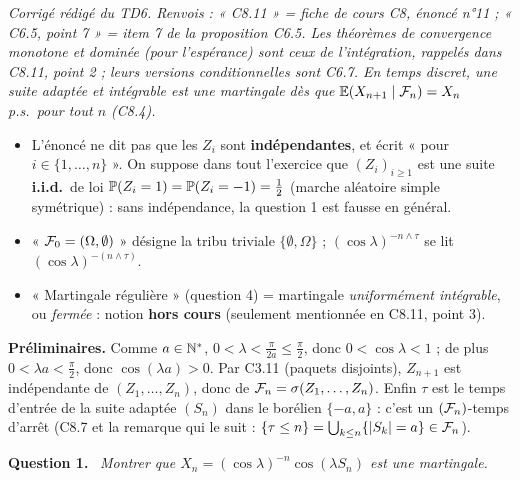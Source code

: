 \documentclass[11pt,a4paper]{article}
\newcommand{\question}[1]{\par\medskip\noindent\textbf{Question #1.}~}
\begin{document}

\textit{Corrigé rédigé du TD6. Renvois : « C8.11 » = fiche de cours C8, énoncé n°11 ; « C6.5, point 7 » = item 7 de la
proposition C6.5. Les théorèmes de convergence monotone et dominée (pour l'espérance) sont ceux de l'intégration, rappelés
dans C8.11, point 2 ; leurs versions conditionnelles sont C6.7. En temps discret, une suite adaptée et intégrable est une
martingale dès que $\mathbb{E}(X_{n+1}\mid\mathcal{F}_n)=X_n$ p.s.\ pour tout $n$ (C8.4).}

\begin{exo}

\begin{alerte}
\begin{itemize}
  \item L'énoncé ne dit pas que les $Z_i$ sont \textbf{indépendantes}, et écrit « pour $i\in\{1,\dots,n\}$ ».
  On suppose dans tout l'exercice que $(Z_i)_{i\ge1}$ est une suite \textbf{i.i.d.}\ de loi $\mathbb{P}(Z_i=1)=\mathbb{P}(Z_i=-1)=\frac12$
  (marche aléatoire simple symétrique) : sans indépendance, la question 1 est fausse en général.
  \item « $\mathcal{F}_0=(\Omega,\emptyset)$ » désigne la tribu triviale $\{\emptyset,\Omega\}$ ; $(\cos\lambda)^{-n\wedge\tau}$ se lit
  $(\cos\lambda)^{-(n\wedge\tau)}$.
  \item « Martingale régulière » (question 4) = martingale \emph{uniformément intégrable}, ou \emph{fermée} : notion
  \textbf{hors cours} (seulement mentionnée en C8.11, point 3).
\end{itemize}
\end{alerte}

\textbf{Préliminaires.} Comme $a\in\mathbb{N}^*$, $0<\lambda<\frac\pi{2a}\le\frac\pi2$, donc $0<\cos\lambda<1$ ; de plus
$0<\lambda a<\frac\pi2$, donc $\cos(\lambda a)>0$. Par C3.11 (paquets disjoints), $Z_{n+1}$ est indépendante de
$(Z_1,\dots,Z_n)$, donc de $\mathcal{F}_n=\sigma(Z_1,\dots,Z_n)$. Enfin $\tau$ est le temps d'entrée de la suite adaptée $(S_n)$ dans
le borélien $\{-a,a\}$ : c'est un $(\mathcal{F}_n)$-temps d'arrêt (C8.7 et la remarque qui le suit : $\{\tau\le n\}=\bigcup_{k\le n}\{|S_k|=a\}\in\mathcal{F}_n$).

\question{1} \emph{Montrer que $X_n=(\cos\lambda)^{-n}\cos(\lambda S_n)$ est une martingale.}


\end{exo}
\end{document}
